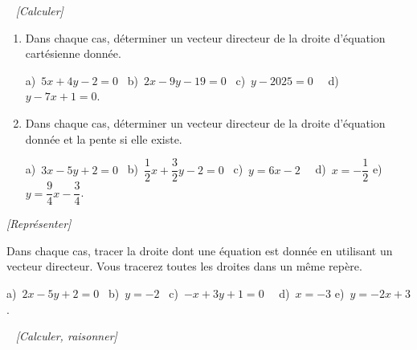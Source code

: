 \exo~ \textit{[Calculer]}

\begin{enumerate}
\item Dans chaque cas, déterminer un vecteur directeur de la droite d'équation cartésienne donnée.

a)~$5x+4y-2=0$~ \hspace{0.8cm }b)~$2x-9y-19=0$~ \hspace{0.8cm}c)~$y-2025=0$~~ \hspace{0.8cm}d)~$y-7x+1=0$.
 
\item Dans chaque cas, déterminer un vecteur directeur de la droite d'équation donnée et la pente si elle existe. 

a)~$3x-5y+2=0$~ \hspace{0.8cm }b)~$\dfrac{1}{2}x+\dfrac{3}{2}y-2=0$~ \hspace{0.8cm}c)~$y=6x-2$~~ \hspace{0.8cm}d)~$x=-\dfrac{1}{2}$ \hspace{0.8cm}e)~$y=\dfrac{9}{4}x-\dfrac{3}{4}$.
\end{enumerate}
  


\medskip

\exo \textit{[Représenter]}

Dans chaque cas, tracer la droite dont une équation est donnée en utilisant un vecteur directeur. Vous tracerez toutes les droites dans un même repère. 

a)~$2x-5y+2=0$~ \hspace{0.8cm }b)~$y=-2$~ \hspace{0.8cm}c)~$-x+3y+1=0$~~ \hspace{0.8cm}d)~$x=-3$ \hspace{0.8cm}e)~$y=-2x+3$.

\exo~ \textit{[Calculer, raisonner]}

